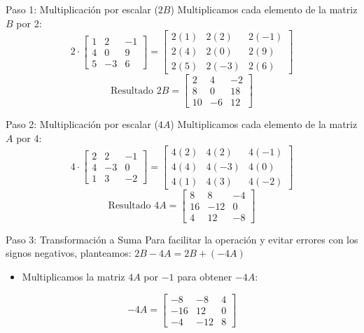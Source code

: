 \documentclass[10pt, aspectratio=169]{beamer}
\begin{document}
	\begin{frame}{Paso 1: Multiplicación por escalar ($2B$)}
		Multiplicamos cada elemento de la matriz $B$ por 2:
		\[ 2 \cdot \begin{bmatrix} 1 & 2 & -1 \\ 4 & 0 & 9 \\ 5 & -3 & 6 \end{bmatrix} = 
		\begin{bmatrix} 2(1) & 2(2) & 2(-1) \\ 2(4) & 2(0) & 2(9) \\ 2(5) & 2(-3) & 2(6) \end{bmatrix} \]
		\pause
		\[ \text{Resultado } 2B = \begin{bmatrix} 2 & 4 & -2 \\ 8 & 0 & 18 \\ 10 & -6 & 12 \end{bmatrix} \]
	\end{frame}
	
	\begin{frame}{Paso 2: Multiplicación por escalar ($4A$)}
		Multiplicamos cada elemento de la matriz $A$ por 4:
		\[ 4 \cdot \begin{bmatrix} 2 & 2 & -1 \\ 4 & -3 & 0 \\ 1 & 3 & -2 \end{bmatrix} = 
		\begin{bmatrix} 4(2) & 4(2) & 4(-1) \\ 4(4) & 4(-3) & 4(0) \\ 4(1) & 4(3) & 4(-2) \end{bmatrix} \]
		\pause
		\[ \text{Resultado } 4A = \begin{bmatrix} 8 & 8 & -4 \\ 16 & -12 & 0 \\ 4 & 12 & -8 \end{bmatrix} \]
	\end{frame}
	
	\begin{frame}{Paso 3: Transformación a Suma}
		\centering
		Para facilitar la operación y evitar errores con los signos negativos, planteamos:
		\vspace{0.5cm}
		{\huge $2B - 4A = 2B + (-4A)$}
		\vspace{0.5cm}
		\begin{itemize}
			\item Multiplicamos la matriz $4A$ por $-1$ para obtener $-4A$:
		\end{itemize}
		\[ -4A = \begin{bmatrix} -8 & -8 & 4 \\ -16 & 12 & 0 \\ -4 & -12 & 8 \end{bmatrix} \]
	\end{frame}
	
\end{document}
